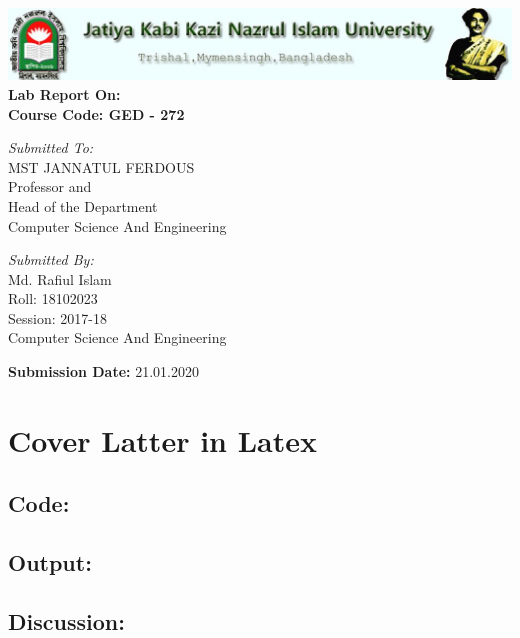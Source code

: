 \documentclass[12pt,a4paper]{report}
\begin{document}
	\begin{titlepage}
			\begin{center}
			\includegraphics[width=\linewidth]{JKKNIU} \\
			\vspace{1cm}
			\large{ \textbf{Lab Report On: \\
					\color{blue}{Technical Writing And Presentation \\}
					\vspace{8mm}
					\color{black}Course Code: GED - 272}}
		\end{center}
		\vspace{8cm}
		\begin{minipage}{0.5\textwidth} 
			\huge{\textit{Submitted To: }} \\
			\large{MST JANNATUL FERDOUS} \\
			Professor and \\ Head of the Department \\
			Computer Science And Engineering
		\end{minipage}
		\begin{minipage}{0.5\textwidth}
			\begin{flushright}
				\vspace{2cm} 
				\huge{\textit{Submitted By: }} \\
				\large{Md. Rafiul Islam} \\
				Roll: 18102023 \\
				Session: 2017-18 \\
				Computer Science And Engineering
			\end{flushright}
		\end{minipage}
		\vspace{2cm}
		\begin{center}
			\textbf{Submission Date:} 21.01.2020
		\end{center}
	\end{titlepage}\newpage
	
	
	\tableofcontents{}
	{
	\chapter[Cover Latter]{Cover Latter in Latex}
	\section{Code: }
	\section{Output: }
	\section{Discussion: }

	}
	
	
	
	
\end{document}
